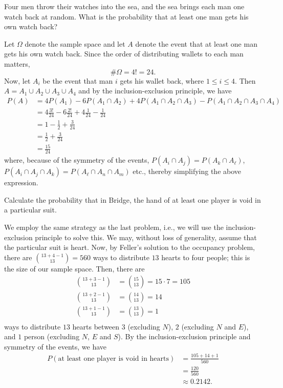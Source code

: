 \begin{problem}[Handout 2, \# 5]
  Four men throw their watches into the sea, and the sea brings each man
  one watch back at random. What is the probability that at least one man
  gets his own watch back?
\end{problem}
\begin{solution}
  Let \(\Omega\) denote the sample space and let \(A\) denote the event
  that at least one man gets his own watch back. Since the order of
  distributing wallets to each man matters,
  \[
    \#\Omega=4!=24.
  \]
  Now, let \(A_i\) be the event that man \(i\) gets his wallet back, where
  \(1\leq i\leq 4\). Then \(A=A_1\cup A_2\cup A_3\cup A_4\) and by the
  inclusion-exclusion principle, we have
  \begin{align*}
    P(A)
    &=4P(A_1)-6P(A_1\cap A_2)+4P(A_1\cap A_2\cap A_3)-P(A_1\cap A_2\cap
      A_3\cap A_4)\\
    &=4\frac{3!}{24}-6\frac{2!}{24}+4\frac{1}{24}-\frac{1}{24}\\
    &=1-\frac{1}{2}+\frac{3}{24}\\
    &=\frac{1}{2}+\frac{3}{24}\\
    &=\frac{15}{24}
  \end{align*}
  where, because of the symmetry of the events,
  \(P(A_i\cap A_j)=P(A_k\cap A_\ell)\),
  \(P(A_i\cap A_j\cap A_k)=P(A_\ell\cap A_n\cap A_m)\) etc., thereby
  simplifying the above expression.
\end{solution}
\newpage

\begin{problem}[Handout 2, \# 7]
  Calculate the probability that in Bridge, the hand of at least one player
  is void in a particular suit.
\end{problem}
\begin{solution}
  We employ the same strategy as the last problem, i.e., we will use the
  inclusion-exclusion principle to solve this. We may, without loss of
  generality, assume that the particular suit is heart. Now, by Feller's
  solution to the occupancy problem, there are
  \(\displaystyle\binom{13+4-1}{13}=560\) ways to distribute \(13\) hearts to
  four people; this is the size of our sample space. Then, there are
  \[
    \begin{aligned}
      \binom{13+3-1}{13}&=\binom{15}{13}=15\cdot 7=105\\
      \binom{13+2-1}{13}&=\binom{14}{13}=14\\
      \binom{13+1-1}{13}&=\binom{13}{13}=1\\
    \end{aligned}
  \]
  ways to distribute \(13\) hearts between \(3\) (excluding \(N\)), \(2\)
  (excluding \(N\) and \(E\)), and \(1\) person (excluding \(N\), \(E\) and
  \(S\)). By the inclusion-exclusion principle and symmetry of the events,
  we have
  \begin{align*}
    P(\text{at least one player is void in hearts})
    &=\frac{105+14+1}{560}\\
    &=\frac{120}{560}\\
    &\approx 0.2142.
  \end{align*}
\end{solution}
\newpage

